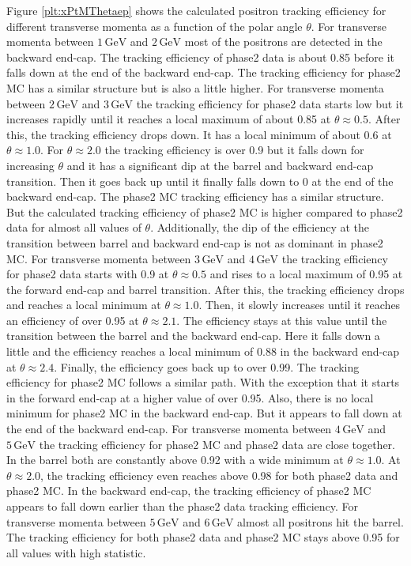 \documentclass[a4paper,11pt,twosided,final,german,openbib,pdftex,listof=totoc,bibliography=totoc]{scrbook}
\begin{document}
Figure \ref{plt:xPtMThetaep} shows the calculated positron tracking efficiency for different transverse momenta as a function of the polar angle $\theta$. For transverse momenta between $1\,\textrm{GeV}$ and $2\,\textrm{GeV}$ most of the positrons are detected in the backward end-cap. The tracking efficiency of phase2 data is about 0.85 before it falls down at the end of the backward end-cap. The tracking efficiency for phase2 MC has a similar structure but is also a little higher.
For transverse momenta between $2\,\textrm{GeV}$ and $3\,\textrm{GeV}$ the tracking efficiency for phase2 data starts low  but it increases rapidly until it reaches a local maximum of about 0.85 at $\theta \approx 0.5$. After this, the tracking efficiency drops down. It has a local minimum of about 0.6 at $\theta \approx 1.0$. For $\theta \approx 2.0$ the tracking efficiency is over 0.9 but it falls down for increasing $\theta$ and it has a significant dip at the barrel and backward end-cap transition. Then it goes back up until it finally falls down to 0 at the end of the backward end-cap. The phase2 MC tracking efficiency has a similar structure. But the calculated tracking efficiency of phase2 MC is higher compared to phase2 data for almost all values of $\theta$. Additionally, the dip of the efficiency at the transition between barrel and backward end-cap is not as dominant in phase2 MC.
For transverse momenta between $3\,\textrm{GeV}$ and $4\,\textrm{GeV}$ the tracking efficiency for phase2 data starts with 0.9 at $\theta \approx 0.5$ and rises to a local maximum of 0.95 at the forward end-cap and barrel transition. After this, the tracking efficiency drops and reaches a local minimum at $\theta \approx 1.0$. Then, it slowly increases until it reaches an efficiency of over 0.95 at $\theta \approx 2.1$. The efficiency stays at this value until the transition between the barrel and the backward end-cap. Here it falls down a little and the efficiency reaches a local minimum of 0.88 in the backward end-cap at $\theta \approx 2.4$. Finally, the efficiency goes back up to over 0.99. The tracking efficiency for phase2 MC follows a similar path. With the exception that it starts in the forward end-cap at a higher value of over 0.95. Also, there is no local minimum for phase2 MC in the backward end-cap. But it appears to fall down at the end of the backward end-cap.
For transverse momenta between $4\,\textrm{GeV}$  and $5\,\textrm{GeV}$ the tracking efficiency for phase2 MC and phase2 data are close together. In the barrel both are constantly above 0.92 with a wide minimum at $\theta \approx 1.0$. At $\theta \approx 2.0$, the tracking efficiency even reaches above 0.98 for both phase2 data and phase2 MC. In the backward end-cap, the tracking efficiency of phase2 MC appears to fall down earlier than the phase2 data tracking efficiency.
For transverse momenta between $5\,\textrm{GeV}$ and $6\,\textrm{GeV}$ almost all positrons hit the barrel. The tracking efficiency for both phase2 data and phase2 MC stays above 0.95 for all values with high statistic.
\end{document}
